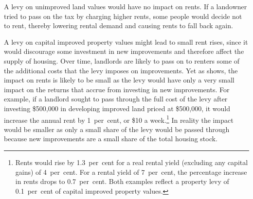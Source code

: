 \documentclass[twoside,english]{palatinob5portrait}
\begin{document}
A levy on unimproved land values would have no impact on rents. If a landowner tried to pass on the tax by charging higher rents, some people would decide not to rent, thereby lowering rental demand and causing rents to fall back again.

A levy on capital improved property values might lead to small rent rises, since it would discourage some investment in new improvements and therefore affect the supply of housing. Over time, landlords are likely to pass on to renters some of the additional costs that the levy imposes on improvements. Yet as  shows, the impact on rents is likely to be small as the levy would have only a very small impact on the returns that accrue from investing in new improvements. For example, if a landlord sought to pass through the full cost of the levy after investing \$500,000 in developing improved land priced at \$500,000, it would increase the annual rent by 1~per~cent, or \$10 a week.\footnote{Rents would rise by 1.3~per~cent for a real rental yield (excluding any capital gains) of 4~per~cent. For a rental yield of 7~per~cent, the percentage increase in rents drops to 0.7~per~cent. Both examples reflect a property levy of 0.1~per~cent of capital improved property values.}  In reality the impact would be smaller as only a small share of the levy would be passed through because new improvements are a small share of the total housing stock.
\end{document}
